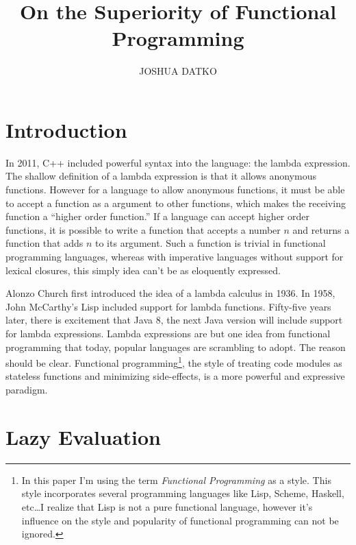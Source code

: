 \documentclass[prodmode]{acmlarge}
\title{On the Superiority of Functional Programming}
\author{JOSHUA DATKO \affil{Drexel University}
}
\begin{document}
\maketitle





\section{Introduction}

In 2011, C++ included powerful syntax into the language: the lambda
expression.  The shallow definition of a lambda expression is that it
allows anonymous functions.  However for a language to allow anonymous
functions, it must be able to accept a function as a argument to
other functions, which makes the receiving function a ``higher order
function.''  If a language can accept higher order functions, it is
possible to write a function that accepts a number $n$ and returns a
function that adds $n$ to its argument.  Such a function is trivial in
functional programming languages, whereas with imperative languages
without support for lexical closures, this simply idea can't be as
eloquently expressed.

Alonzo Church first introduced the idea of a lambda calculus in 1936.
In 1958, John McCarthy's Lisp included support for lambda functions.
Fifty-five years later, there is excitement that Java 8, the next Java
version will include support for lambda expressions.  Lambda
expressions are but one idea from functional programming that today,
popular languages are scrambling to adopt.  The reason should be
clear.  Functional programming\footnote{In this paper I'm using the
  term \emph{Functional Programming} as a style.  This style
  incorporates several programming languages like Lisp, Scheme,
  Haskell, etc\ldots I realize that Lisp is not a pure functional
  language, however it's influence on the style and popularity of
  functional programming can not be ignored.}, the style of treating
code modules as stateless functions and minimizing side-effects, is a
more powerful and expressive paradigm.

\section{Lazy Evaluation}
\end{document}
